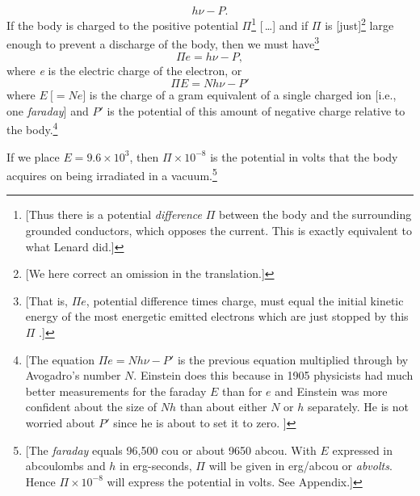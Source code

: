 \begin{equation*}
h\nu - P.
\end{equation*}
%
If the body is charged to the positive potential $\Pi$\footnote{{[}Thus
  there is a potential \emph{difference} $\Pi$ between the body and
  the surrounding grounded conductors, which opposes the current. This
  is exactly equivalent to what Lenard did.{]}} [\,\ldots] and if $\Pi$
is {[}just{]}\footnote{{[}We here correct an omission in the
  translation.{]}} large enough to prevent a discharge of the body, then
we must have\footnote{{[}That is, $\Pi e$,
  potential difference times charge, must equal the initial kinetic
  energy of the most energetic emitted electrons which are just stopped
  by this $\Pi$ .{]}}
%
\begin{equation*}
\Pi e = h\nu - P,
\end{equation*}
%
where \emph{e} is the electric charge of the electron, or
%
\begin{equation*}
\Pi E = Nh\nu - P'
\end{equation*}
%
where $E \: \text{[}\!= Ne\text{]}$ is the charge of a gram equivalent of a
single charged ion {[}i.e., one \emph{faraday}{]} and $P'$ is the
potential of this amount of negative charge relative to the
body.\footnote{{[}The equation $\Pi e = Nh\nu - P'$ is the
  previous equation multiplied through by Avogadro's number $N$.
  Einstein does this because in 1905 physicists had much better
  measurements for the faraday $E$ than for $e$ and Einstein
  was more confident about the size of $Nh$ than about either
  $N$ or $h$ separately. He is not worried about $P'$
  since he is about to set it to zero. {]}}

If we place $E = 9.6\times 10^3$, then $\Pi\times 10^{-8}$ is the potential
in volts that the body acquires on being irradiated in a
vacuum.\footnote{{[}The \emph{faraday} equals 96,500 cou or about 9650
  abcou. With $E$ expressed in abcoulombs and $h$ in
  erg-seconds, $\Pi$ will be given in erg/abcou or \emph{abvolts}.
  Hence $\Pi\times 10^{-8}$ will express the potential in volts. See
  Appendix.{]}}

